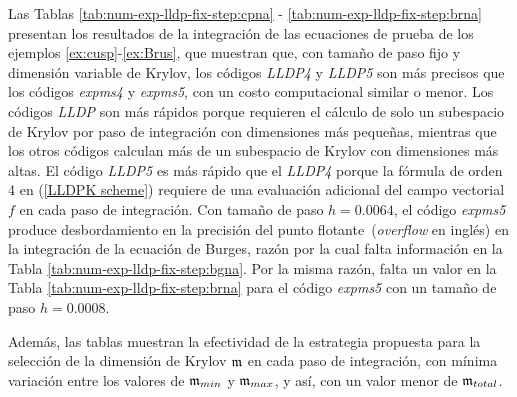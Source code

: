 Las Tablas \ref{tab:num-exp-lldp-fix-step:cpna} - \ref{tab:num-exp-lldp-fix-step:brna} presentan los resultados de la integración de las ecuaciones de prueba de los ejemplos \ref{ex:cusp}-\ref{ex:Brus}, que muestran que, con tamaño de paso fijo y dimensión variable de Krylov, los códigos \emph{LLDP4} y \emph{LLDP5} son más precisos que los códigos \emph{expms4} y \emph{expms5}, con un costo computacional similar o menor. Los códigos \emph{LLDP} son más rápidos porque requieren el cálculo de solo un subespacio de Krylov por paso de integración con dimensiones más pequeñas, mientras que los otros códigos calculan más de un subespacio de Krylov con dimensiones más altas. El código \emph{LLDP5} es más rápido que el \emph{LLDP4} porque la fórmula de orden 4 en (\ref{LLDPK scheme}) requiere de una evaluación adicional del campo vectorial $f$ en cada paso de integración. Con tamaño de paso $h = 0.0064$, el código \emph{expms5} produce desbordamiento en la precisión del punto flotante~(\textit{overflow} en inglés) en la integración de la ecuación de Burges, razón por la cual falta información en la Tabla \ref{tab:num-exp-lldp-fix-step:bgna}. Por la misma razón, falta un valor en la Tabla \ref{tab:num-exp-lldp-fix-step:brna} para el código \emph{expms5} con un tamaño de paso $h = 0.0008$.

Además, las tablas muestran la efectividad de la estrategia propuesta para la selección de la dimensión de Krylov $\mathfrak{m}$ en cada paso de integración, con mínima variación entre los valores de $\mathfrak{m}_{min}$ y $\mathfrak{m}_{max}$, y así, con un valor menor de $\mathfrak{m}_{total}$.

